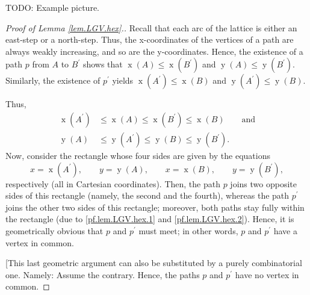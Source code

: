 \documentclass[reqno]{amsart}%
\newcommand{\0}{\phantom{c}}
\theoremstyle{plain}
\theoremstyle{definition}
\numberwithin{equation}{section}
\begin{document}
TODO: Example picture.

\begin{proof}
[Proof of Lemma \ref{lem.LGV.hex}.]Recall that each arc of the lattice is
either an east-step or a north-step. Thus, the x-coordinates of the vertices
of a path are always weakly increasing, and so are the y-coordinates. Hence,
the existence of a path $p$ from $A$ to $B^{\prime}$ shows that
$\operatorname*{x}\left(  A\right)  \leq\operatorname*{x}\left(  B^{\prime
}\right)  $ and $\operatorname*{y}\left(  A\right)  \leq\operatorname*{y}%
\left(  B^{\prime}\right)  $. Similarly, the existence of $p^{\prime}$ yields
$\operatorname*{x}\left(  A^{\prime}\right)  \leq\operatorname*{x}\left(
B\right)  $ and $\operatorname*{y}\left(  A^{\prime}\right)  \leq
\operatorname*{y}\left(  B\right)  $.

Thus,%
\begin{align}
\operatorname*{x}\left(  A^{\prime}\right)   &  \leq\operatorname*{x}\left(
A\right)  \leq\operatorname*{x}\left(  B^{\prime}\right)  \leq
\operatorname*{x}\left(  B\right)  \qquad\text{and}\label{pf.lem.LGV.hex.1}\\
\operatorname*{y}\left(  A\right)   &  \leq\operatorname*{y}\left(  A^{\prime
}\right)  \leq\operatorname*{y}\left(  B\right)  \leq\operatorname*{y}\left(
B^{\prime}\right)  . \label{pf.lem.LGV.hex.2}%
\end{align}
Now, consider the rectangle whose four sides are given by the equations%
\[
x=\operatorname*{x}\left(  A^{\prime}\right)  ,\qquad y=\operatorname*{y}%
\left(  A\right)  ,\qquad x=\operatorname*{x}\left(  B\right)  ,\qquad
y=\operatorname*{y}\left(  B^{\prime}\right)  ,
\]
respectively (all in Cartesian coordinates). Then, the path $p$ joins two
opposite sides of this rectangle (namely, the second and the fourth), whereas
the path $p^{\prime}$ joins the other two sides of this rectangle; moreover,
both paths stay fully within the rectangle (due to \eqref{pf.lem.LGV.hex.1}
and \eqref{pf.lem.LGV.hex.2}). Hence, it is geometrically obvious that $p$ and
$p^{\prime}$ must meet; in other words, $p$ and $p^{\prime}$ have a vertex in common.

[This last geometric argument can also be substituted by a purely
combinatorial one. Namely: Assume the contrary. Hence, the paths $p$ and
$p^{\prime}$ have no vertex in common.


\end{proof}
\end{document}
